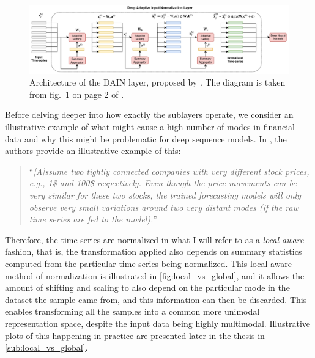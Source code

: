 \documentclass{statsmsc}
\begin{document}
{%
\begin{figure}
    \begin{center}
        \includegraphics[width=\textwidth]{diagrams/dain_diagram.pdf}
    \end{center}
    \caption{Architecture of the \acf{DAIN} layer, proposed by \citeauthor{dain}. The diagram
    is taken from fig.\ 1 on page 2 of \cite{dain}.}
    \label{fig:dain-arch}
\end{figure}

Before delving deeper into how exactly the sublayers operate, we consider an illustrative
example of what might cause a high number of modes in financial data and why this might
be problematic for deep sequence models. In
\cite{dain}, the authors provide an illustrative example of this:
\begin{quote}
    ``\textit{[A]ssume two tightly
    connected companies with very different stock prices, e.g., 1\$
    and 100\$ respectively. Even though the price movements can
    be very similar for these two stocks, the trained forecasting
    models will only observe very small variations around two
    very distant modes (if the raw time series are fed to the model).}''
\end{quote}
Therefore, the time-series are normalized in what I will refer to as a
\textit{local-aware} fashion, that is, the transformation applied also depends
on summary statistics
computed from  the particular time-series being normalized. This local-aware method of normalization
is illustrated in \cref{fig:local_vs_global}, and it allows
the amount of shifting and scaling to also depend on the particular mode in the dataset the sample
came from, and this information can then be discarded.
This enables transforming all the samples into a common more unimodal
representation space, despite the input data being highly multimodal.
Illustrative plots of this happening in practice are presented later in the thesis in
\cref{sub:local_vs_global}.

}
\end{document}
